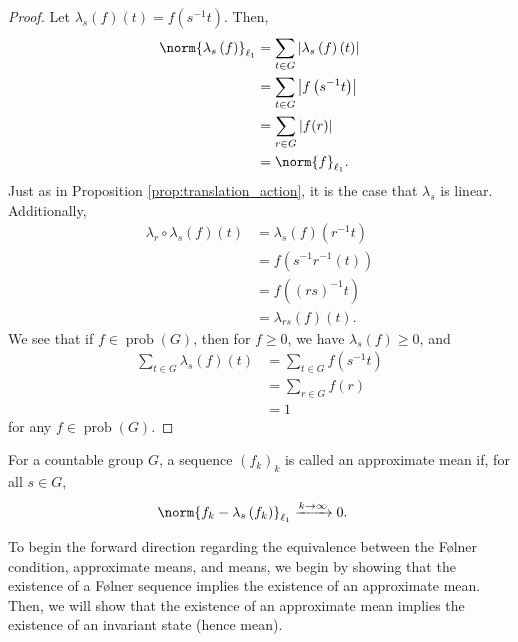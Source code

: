 \documentclass[10pt]{mypackage2}
\begin{document}
\begin{proof}
  Let $\lambda_s\left(f\right)\left(t\right) = f\left(s^{-1}t\right)$. Then,
  \begin{align*}
    \norm{\lambda_s\left(f\right)}_{\ell_1} &= \sum_{t\in G}\left\vert \lambda_s\left(f\right)\left(t\right) \right\vert\\
                                     &= \sum_{t\in G}\left\vert f\left(s^{-1}t\right) \right\vert\\
                                     &= \sum_{r\in G}\left\vert f(r) \right\vert\\
                                     &= \norm{f}_{\ell_1}.
  \end{align*}
  Just as in Proposition \ref{prop:translation_action}, it is the case that $\lambda_s$ is linear. Additionally,
  \begin{align*}
    \lambda_r\circ \lambda_s\left(f\right)\left(t\right) &= \lambda_s\left(f\right)\left(r^{-1}t\right)\\
                                                         &= f\left(s^{-1}r^{-1}\left(t\right)\right)\\
                                                         &= f\left(\left(rs\right)^{-1}t\right)\\
                                                         &= \lambda_{rs}\left(f\right)\left(t\right).
  \end{align*}
  We see that if $f\in \operatorname{prob}(G)$, then for $f\geq 0$, we have $\lambda_s\left(f\right) \geq 0$, and
  \begin{align*}
    \sum_{t\in G}\lambda_s\left(f\right)\left(t\right) &= \sum_{t\in G}f\left(s^{-1}t\right)\\
                                                       &= \sum_{r\in G}f\left(r\right)\\
                                                       &= 1
  \end{align*}
  for any $f\in \operatorname{prob}(G)$.
\end{proof}
\begin{definition}\label{def:approximate_mean}
  For a countable group $G$, a sequence $\left(f_k\right)_k$ is called an approximate mean if, for all $s\in G$,
  \begin{align*}
    \norm{f_k - \lambda_s\left(f_k\right)}_{\ell_1} &\xrightarrow{k\rightarrow \infty}0.
  \end{align*}
\end{definition}
To begin the forward direction regarding the equivalence between the Følner condition, approximate means, and means, we begin by showing that the existence of a Følner sequence implies the existence of an approximate mean. Then, we will show that the existence of an approximate mean implies the existence of an invariant state (hence mean).
\end{document}
